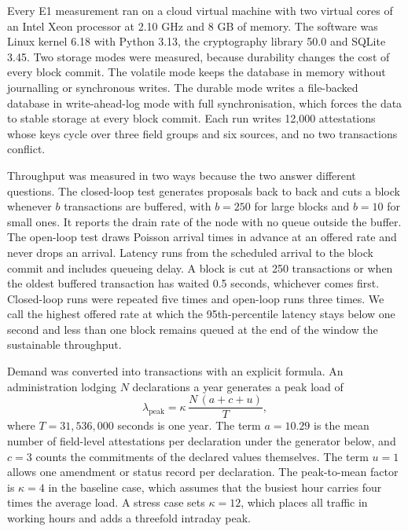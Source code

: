 \documentclass[information,article,submit,moreauthors]{Definitions/mdpi}
\begin{document}
Every E1 measurement ran on a cloud virtual machine with two virtual cores of an Intel Xeon processor at 2.10 GHz and 8 GB of memory. The software was Linux kernel 6.18 with Python 3.13, the cryptography library 50.0 and SQLite 3.45. Two storage modes were measured, because durability changes the cost of every block commit. The volatile mode keeps the database in memory without journalling or synchronous writes. The durable mode writes a file-backed database in write-ahead-log mode with full synchronisation, which forces the data to stable storage at every block commit. Each run writes 12{,}000 attestations whose keys cycle over three field groups and six sources, and no two transactions conflict.

Throughput was measured in two ways because the two answer different questions. The closed-loop test generates proposals back to back and cuts a block whenever $b$ transactions are buffered, with $b = 250$ for large blocks and $b = 10$ for small ones. It reports the drain rate of the node with no queue outside the buffer. The open-loop test draws Poisson arrival times in advance at an offered rate and never drops an arrival. Latency runs from the scheduled arrival to the block commit and includes queueing delay. A block is cut at 250 transactions or when the oldest buffered transaction has waited 0.5 seconds, whichever comes first. Closed-loop runs were repeated five times and open-loop runs three times. We call the highest offered rate at which the 95th-percentile latency stays below one second and less than one block remains queued at the end of the window the sustainable throughput.

Demand was converted into transactions with an explicit formula. An administration lodging $N$ declarations a year generates a peak load of
\begin{equation}\label{eq:peak}
\lambda_{\text{peak}} = \kappa \, \frac{N \, (a + c + u)}{T},
\end{equation}
where $T = 31{,}536{,}000$ seconds is one year. The term $a = 10.29$ is the mean number of field-level attestations per declaration under the generator below, and $c = 3$ counts the commitments of the declared values themselves. The term $u = 1$ allows one amendment or status record per declaration. The peak-to-mean factor is $\kappa = 4$ in the baseline case, which assumes that the busiest hour carries four times the average load. A stress case sets $\kappa = 12$, which places all traffic in working hours and adds a threefold intraday peak.
\end{document}
